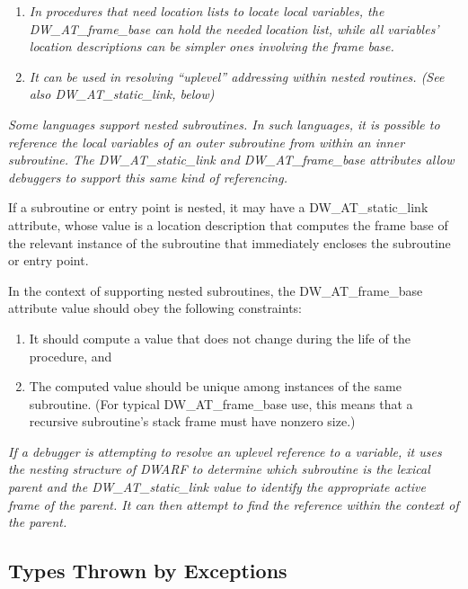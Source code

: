 \begin{enumerate}[1.]
\item \textit{In procedures that need location lists to locate local
variables, the DW\_AT\_frame\_base can hold the needed location
list, while all variables’ location descriptions can be
simpler ones involving the frame base.}

\item \textit{It can be used in resolving ``up\dash level'' addressing
within nested routines. 
(See also DW\_AT\_static\_link, below)}
\end{enumerate}

\textit{Some languages support nested subroutines. In such languages,
it is possible to reference the local variables of an
outer subroutine from within an inner subroutine. The
DW\_AT\_static\_link and DW\_AT\_frame\_base attributes allow
debuggers to support this same kind of referencing.}

If a subroutine or entry point is nested, it may have a
DW\_AT\_static\_link attribute, whose value is a location
description that computes the frame base of the relevant
instance of the subroutine that immediately encloses the
subroutine or entry point.

In the context of supporting nested subroutines, the
DW\_AT\_frame\_base attribute value should obey the following
constraints:

\begin{enumerate}[1.]
\item It should compute a value that does not change during the
life of the procedure, and

\item The computed value should be unique among instances of
the same subroutine. (For typical DW\_AT\_frame\_base use, this
means that a recursive subroutine’s stack frame must have
non\dash zero size.)
\end{enumerate}

\textit{If a debugger is attempting to resolve an up\dash level reference
to a variable, it uses the nesting structure of DWARF to
determine which subroutine is the lexical parent and the
DW\_AT\_static\_link value to identify the appropriate active
frame of the parent. It can then attempt to find the reference
within the context of the parent.}



\subsection{Types Thrown by Exceptions}
\label{chap:typesthrownbyexceptions}

